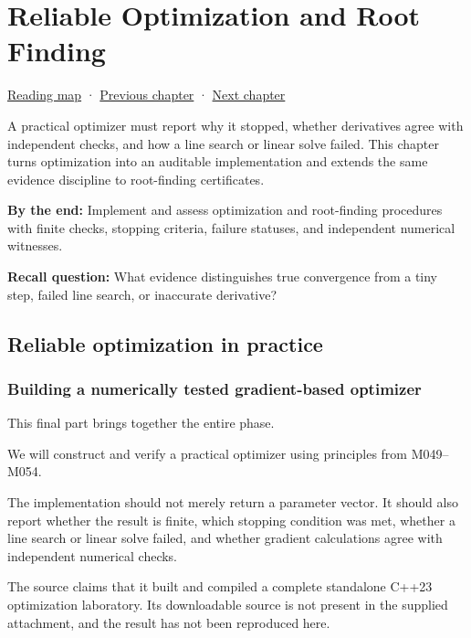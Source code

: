 \hypertarget{02-foundations-ii-ch028}{}
\chapter{Reliable Optimization and Root Finding}\label{02-foundations-ii-ch028-reliable-optimization-and-root-finding}

\hyperref[volume-reading-map]{Reading map} · \hyperref[02-foundations-ii-ch027-gaussnewton-for-geometry-and-pose]{Previous chapter} · \hyperref[02-foundations-ii-ch029-discretization-convergence-and-experimental-design]{Next chapter}

A practical optimizer must report why it stopped, whether derivatives agree with independent checks, and how a line search or linear solve failed. This chapter turns optimization into an auditable implementation and extends the same evidence discipline to root-finding certificates.

\textbf{By the end:} Implement and assess optimization and root-finding procedures with finite checks, stopping criteria, failure statuses, and independent numerical witnesses.

\textbf{Recall question:} What evidence distinguishes true convergence from a tiny step, failed line search, or inaccurate derivative?

\section{Reliable optimization in practice}\label{02-foundations-ii-ch028-reliable-optimization-in-practice}

\subsection{Building a numerically tested gradient-based optimizer}\label{02-foundations-ii-ch028-building-a-numerically-tested-gradient-based-optimizer}

This final part brings together the entire phase.

We will construct and verify a practical optimizer using principles from M049--M054.

The implementation should not merely return a parameter vector. It should also report whether the result is finite, which stopping condition was met, whether a line search or linear solve failed, and whether gradient calculations agree with independent numerical checks.

The source claims that it built and compiled a complete standalone C++23 optimization laboratory. Its downloadable source is not present in the supplied attachment, and the result has not been reproduced here.

